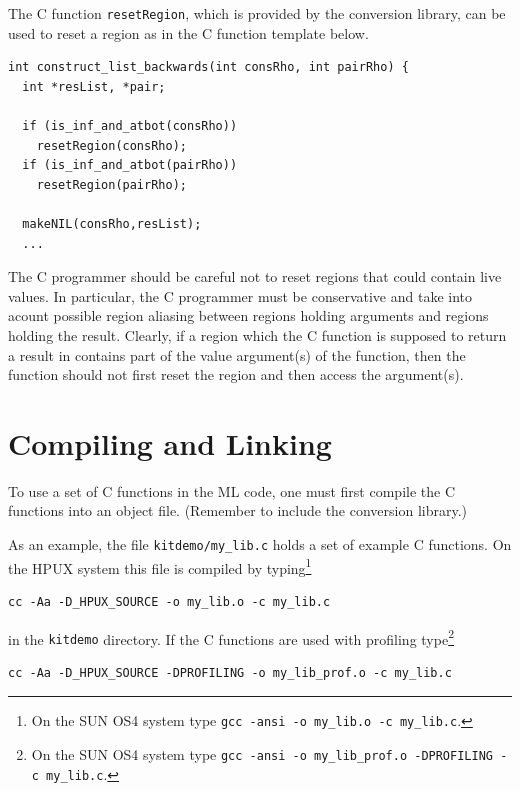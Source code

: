 \documentclass[12pt]{book}
\begin{document}
The C function \texttt{resetRegion}, which is 
provided by the conversion library,
can be used to reset a region as in the C function template below.

\begin{verbatim}
int construct_list_backwards(int consRho, int pairRho) {
  int *resList, *pair;

  if (is_inf_and_atbot(consRho))
    resetRegion(consRho);
  if (is_inf_and_atbot(pairRho))
    resetRegion(pairRho);

  makeNIL(consRho,resList);  
  ...
\end{verbatim}

\noindent The C programmer should be careful not to reset regions that
could contain live values. In particular, the C programmer must be
conservative and take into acount possible region aliasing between
regions holding arguments and regions holding the result. 
Clearly, if a region which the C function is supposed to
return a result in contains part of the value argument(s) of the function,
then the function should not first reset the region and 
then access the argument(s).

\section{Compiling and Linking}
To use a set of C functions in the ML code, one must first compile the
C functions into an object file. (Remember to include the conversion
library.) 

As an example, the file {\tt kitdemo/my\_lib.c} holds a set of example
C functions. On the HPUX system this file is compiled by
typing\footnote{On the SUN OS4 system type {\tt gcc -ansi -o my\_lib.o
-c my\_lib.c}.}
\begin{verbatim}
cc -Aa -D_HPUX_SOURCE -o my_lib.o -c my_lib.c
\end{verbatim}
\noindent
in the {\tt kitdemo} directory. If the C functions are used with
profiling type\footnote{On the SUN OS4 system type {\tt gcc -ansi -o
my\_lib\_prof.o -DPROFILING -c my\_lib.c}.}
\begin{verbatim}
cc -Aa -D_HPUX_SOURCE -DPROFILING -o my_lib_prof.o -c my_lib.c
\end{verbatim}
\end{document}

